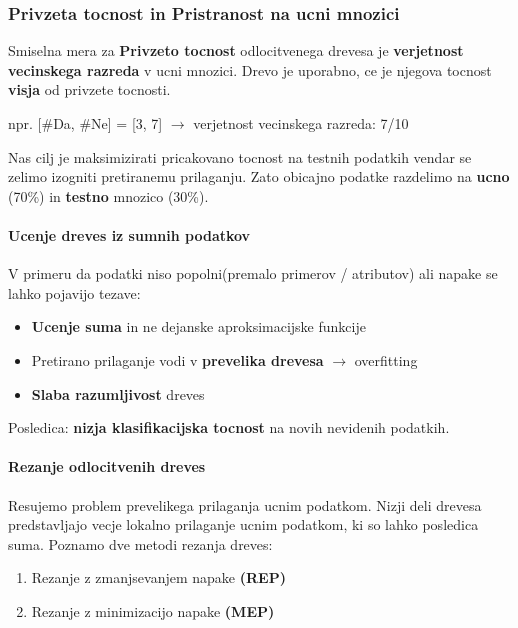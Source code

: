 \documentclass{article}
\begin{document}
\begin{multicols}{2}
\subsubsection{Privzeta tocnost in Pristranost na ucni mnozici}

Smiselna mera za \textbf{Privzeto tocnost} odlocitvenega drevesa je \textbf{verjetnost vecinskega razreda} v
ucni mnozici. Drevo je uporabno, ce je njegova tocnost \textbf{visja} od privzete tocnosti.

npr. [\#Da, \#Ne] = [3, 7] $\rightarrow$ verjetnost vecinskega razreda: 7/10


Nas cilj je maksimizirati pricakovano tocnost na testnih podatkih vendar se zelimo izogniti pretiranemu prilaganju. Zato obicajno podatke
razdelimo na \textbf{ucno} (70\%) in \textbf{testno} mnozico (30\%).

\paragraph{Ucenje dreves iz sumnih podatkov}
V primeru da podatki niso popolni(premalo primerov / atributov) ali napake
se lahko pojavijo tezave:
\begin{itemize}
  \item \textbf{Ucenje suma} in ne dejanske aproksimacijske funkcije
  \item Pretirano prilaganje vodi v \textbf{prevelika drevesa} $\rightarrow$ overfitting
  \item \textbf{Slaba razumljivost} dreves
\end{itemize}
Posledica: \textbf{nizja klasifikacijska tocnost} na novih nevidenih podatkih.

\paragraph{Rezanje odlocitvenih dreves}
Resujemo problem prevelikega prilaganja ucnim podatkom.
Nizji deli drevesa predstavljajo vecje lokalno prilaganje ucnim podatkom, ki so lahko posledica suma.
Poznamo dve metodi rezanja dreves:

\begin{enumerate}
  \item Rezanje z zmanjsevanjem napake \textbf{(REP)}
  \item Rezanje z minimizacijo napake \textbf{(MEP)}
\end{enumerate}

\end{multicols}
\end{document}
